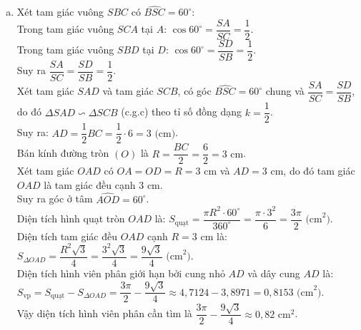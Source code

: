 \begin{bt}
{\begin{enumerate}[a)]
	Trong đường tròn $(I)$ đường kính $SH$, tam giác $IAH$ cân tại $I$ (do $IA = IH = \dfrac{SH}{2}$) nên:
	$\widehat{IAH} = \widehat{IHA} = \widehat{SH A}$.\\
	Mặt khác, tứ giác $HDMC$ nội tiếp (do $\widehat{HDC} = 90^\circ$ và $\widehat{HMC} = 90^\circ$), nên:
	$\widehat{KDC} = \widehat{HDC} - \widehat{HDM} = 90^\circ - \widehat{HDM}$.\\
	Trong tứ giác nội tiếp $SDHM$, ta có $\widehat{HDM} = \widehat{HSM}$. Trong tam giác vuông $SH A$ vuông tại $A$, ta có $\widehat{HSM} = 90^\circ - \widehat{SHA}$.\\
	Từ đó suy ra $\widehat{KDC} = \widehat{SHA} = \widehat{IAH}$.
	\item Xét tam giác vuông $SBC$ có $\widehat{BSC} = 60^\circ$:\\
	Trong tam giác vuông $SCA$ tại $A$: $\cos 60^\circ = \dfrac{SA}{SC} = \dfrac{1}{2}$.\\
	Trong tam giác vuông $SBD$ tại $D$: $\cos 60^\circ = \dfrac{SD}{SB} = \dfrac{1}{2}$.\\
	Suy ra $\dfrac{SA}{SC} = \dfrac{SD}{SB} = \dfrac{1}{2}$.\\
	Xét tam giác $SAD$ và tam giác $SCB$, có góc $\widehat{BSC} = 60^\circ$ chung và $\dfrac{SA}{SC} = \dfrac{SD}{SB}$, do đó $\Delta SAD \backsim \Delta SCB$ (c.g.c) theo tỉ số đồng dạng $k = \dfrac{1}{2}$.\\
	Suy ra: $AD = \dfrac{1}{2} BC = \dfrac{1}{2} \cdot 6 = 3\text{ (cm)}$.\\
	Bán kính đường tròn $(O)$ là $R = \dfrac{BC}{2} = \dfrac{6}{2} = 3\text{ cm}$.\\
	Xét tam giác $OAD$ có $OA = OD = R = 3\text{ cm}$ và $AD = 3\text{ cm}$, do đó tam giác $OAD$ là tam giác đều cạnh $3\text{ cm}$.\\
	Suy ra góc ở tâm $\widehat{AOD} = 60^\circ$.\\
	Diện tích hình quạt tròn $OAD$ là:
	$S_{\text{quạt}} = \dfrac{\pi R^2 \cdot 60^\circ}{360^\circ} = \dfrac{\pi \cdot 3^2}{6} = \dfrac{3\pi}{2}\text{ (cm}^2\text{)}$.\\
	Diện tích tam giác đều $OAD$ cạnh $R = 3\text{ cm}$ là:
	$S_{\Delta OAD} = \dfrac{R^2\sqrt{3}}{4} = \dfrac{3^2\sqrt{3}}{4} = \dfrac{9\sqrt{3}}{4}\text{ (cm}^2\text{)}$.\\
	Diện tích hình viên phân giới hạn bởi cung nhỏ $AD$ và dây cung $AD$ là:
	$S_{\text{vp}} = S_{\text{quạt}} - S_{\Delta OAD} = \dfrac{3\pi}{2} - \dfrac{9\sqrt{3}}{4} \approx 4{,}7124 - 3{,}8971 = 0{,}8153\text{ (cm}^2\text{)}$.\\
	Vậy diện tích hình viên phân cần tìm là $\dfrac{3\pi}{2} - \dfrac{9\sqrt{3}}{4} \approx 0{,}82\text{ cm}^2$.
\end{enumerate}
}
\end{bt}

